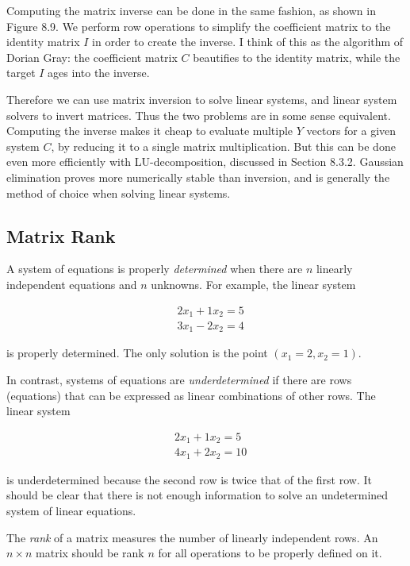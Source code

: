 \documentclass[10pt]{article}
\begin{document}
Computing the matrix inverse can be done in the same fashion, as shown in Figure 8.9. We perform row operations to simplify the coefficient matrix to the identity matrix \(I\) in order to create the inverse. I think of this as the algorithm of Dorian Gray: the coefficient matrix \(C\) beautifies to the identity matrix, while the target \(I\) ages into the inverse.

Therefore we can use matrix inversion to solve linear systems, and linear system solvers to invert matrices. Thus the two problems are in some sense equivalent. Computing the inverse makes it cheap to evaluate multiple \(Y\) vectors for a given system \(C\), by reducing it to a single matrix multiplication. But this can be done even more efficiently with LU-decomposition, discussed in Section 8.3.2. Gaussian elimination proves more numerically stable than inversion, and is generally the method of choice when solving linear systems.

\subsection*{Matrix Rank}
A system of equations is properly \textit{determined} when there are \(n\) linearly independent equations and \(n\) unknowns. For example, the linear system

\[
\begin{aligned}
& 2x_{1} + 1x_{2} = 5 \\
& 3x_{1} - 2x_{2} = 4
\end{aligned}
\]

is properly determined. The only solution is the point \((x_{1}=2, x_{2}=1)\).

In contrast, systems of equations are \textit{underdetermined} if there are rows (equations) that can be expressed as linear combinations of other rows. The linear system

\[
\begin{aligned}
& 2x_{1} + 1x_{2} = 5 \\
& 4x_{1} + 2x_{2} = 10
\end{aligned}
\]

is underdetermined because the second row is twice that of the first row. It should be clear that there is not enough information to solve an undetermined system of linear equations.

The \textit{rank} of a matrix measures the number of linearly independent rows. An \(n \times n\) matrix should be rank \(n\) for all operations to be properly defined on it.
\end{document}
